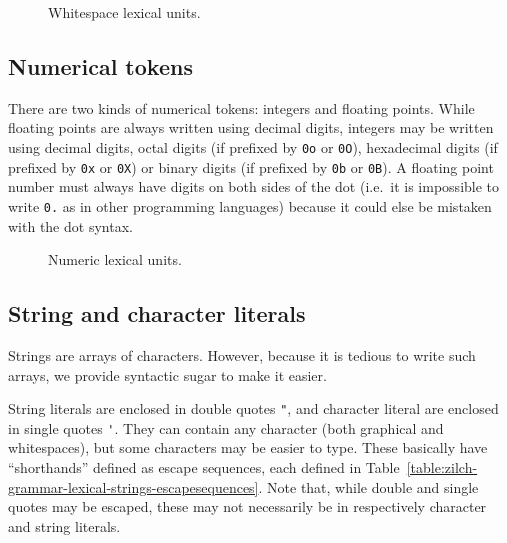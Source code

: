 \begin{figure}[H]
  \centering


  \caption{Whitespace lexical units.}
  \label{fig:zilch-grammar-lexical-whitespaces-grammar}
\end{figure}

\subsection{Numerical tokens}\label{subsec:zilch-grammar-lexical-numbers}

There are two kinds of numerical tokens: integers and floating points.
While floating points are always written using decimal digits, integers may be written using decimal digits, octal digits (if prefixed by \verb|0o| or \verb|0O|), hexadecimal digits (if prefixed by \verb|0x| or \verb|0X|) or binary digits (if prefixed by \verb|0b| or \verb|0B|).
A floating point number must always have digits on both sides of the dot (i.e.\ it is impossible to write \verb|0.| as in other programming languages) because it could else be mistaken with the dot syntax.

\begin{figure}[H]
  \centering


  \caption{Numeric lexical units.}
  \label{fig:zilch-grammar-lexical-numbers-grammar}
\end{figure}

\subsection{String and character literals}\label{subsec:zilch-grammar-lexical-strings}

Strings are arrays of characters.
However, because it is tedious to write such arrays, we provide syntactic sugar to make it easier.

String literals are enclosed in double quotes \verb|"|, and character literal are enclosed in single quotes \verb|'|.
They can contain any character (both graphical and whitespaces), but some characters may be easier to type.
These basically have ``shorthands'' defined as escape sequences, each defined in Table~\ref{table:zilch-grammar-lexical-strings-escapesequences}.
Note that, while double and single quotes may be escaped, these may not necessarily be in respectively character and string literals.

